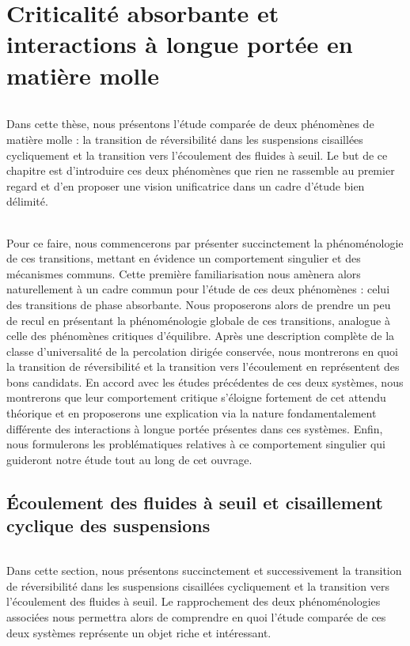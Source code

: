\chapter{Criticalité absorbante et interactions à longue portée en matière molle}

\label{chapter:introduction}

\subparagraph{}Dans cette thèse, nous présentons l'étude comparée de deux phénomènes de matière molle : la transition de réversibilité dans les suspensions cisaillées cycliquement et la transition vers l'écoulement des fluides à seuil. Le but de ce chapitre est d'introduire ces deux phénomènes que rien ne rassemble au premier regard et d'en proposer une vision unificatrice dans un cadre d'étude bien délimité.

\subparagraph{}Pour ce faire, nous commencerons par présenter succinctement la phénoménologie de ces transitions, mettant en évidence un comportement singulier et des mécanismes communs. Cette première familiarisation nous amènera alors naturellement à un cadre commun pour l'étude de ces deux phénomènes : celui des transitions de phase absorbante. Nous proposerons alors de prendre un peu de recul en présentant la phénoménologie globale de ces transitions, analogue à celle des phénomènes critiques d'équilibre. Après une description complète de la classe d'universalité de la percolation dirigée conservée, nous montrerons en quoi la transition de réversibilité et la transition vers l'écoulement en représentent des bons candidats. En accord avec les études précédentes de ces deux systèmes, nous montrerons que leur comportement critique s'éloigne fortement de cet attendu théorique et en proposerons une explication via la nature fondamentalement différente des interactions à longue portée présentes dans ces systèmes. Enfin, nous formulerons les problématiques relatives à ce comportement singulier qui guideront notre étude tout au long de cet ouvrage.

\section{Écoulement des fluides à seuil et cisaillement cyclique des suspensions}

\subparagraph{}Dans cette section, nous présentons succinctement et successivement la transition de réversibilité dans les suspensions cisaillées cycliquement et la transition vers l'écoulement des fluides à seuil. Le rapprochement des deux phénoménologies associées nous permettra alors de comprendre en quoi l'étude comparée de ces deux systèmes représente un objet riche et intéressant.


